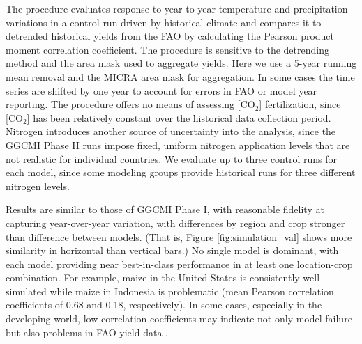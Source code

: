 \documentclass[gmd, manuscript]{copernicus} %
\begin{document}

The \citet{muller_global_2017} procedure evaluates response to year-to-year temperature and precipitation variations in a control run driven by historical climate and compares it to detrended historical yields from the FAO \citep{FAOSTAT} by calculating the Pearson product moment correlation coefficient. 
The procedure is sensitive to the detrending method and the area mask used to aggregate yields. 
Here we use a 5-year running mean removal and the MICRA area mask for aggregation. 
In some cases the time series are shifted by one year to account for errors in FAO or model year reporting. 
The procedure offers no means of assessing [CO$_2$] fertilization, since [CO$_2$] has been relatively constant over the historical data collection period. 
Nitrogen introduces another source of uncertainty into the analysis, since the GGCMI Phase II runs impose fixed, uniform nitrogen application levels that are not realistic for individual countries. 
We evaluate up to three control runs for each model, since some modeling groups provide historical runs for three different nitrogen levels. 

Results are similar to those of GGCMI Phase I, with reasonable fidelity at capturing year-over-year variation, with differences by region and crop stronger than difference between models. 
(That is, Figure \ref{fig:simulation_val} shows more similarity in horizontal than vertical bars.) 
No single model is dominant, with each model providing near best-in-class performance in at least one location-crop combination. 
For example, maize in the United States is consistently well-simulated while maize in Indonesia is problematic (mean Pearson correlation coefficients of 0.68 and 0.18, respectively). 
In some cases, especially in the developing world, low correlation coefficients may indicate not only model failure but also problems in FAO yield data \citep{Ray2012,muller_global_2017}. 
\end{document}
